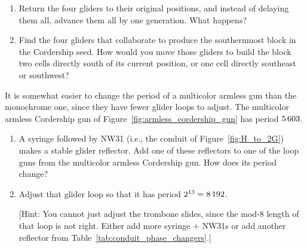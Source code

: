\begin{multicols}{2}
\begin{problem}
\begin{enumerate}[label=\bf\color{ocre}(\alph*)]
			\item {} Return the four gliders to their original positions, and instead of delaying them all, advance them all by one generation. What happens?
			
			\item {} Find the four gliders that collaborate to produce the southernmost block in the Cordership seed. How would you move those gliders to build the block two cells directly south of its current position, or one cell directly southeast or southwest?
		\end{enumerate}
	\end{problem}


	\mfilbreak
	
	
	\begin{problem}\label{exer:multicolor_armless}
		It is somewhat easier to change the period of a multicolor armless gun than the monochrome one, since they have fewer glider loops to adjust. The multicolor armless Cordership gun of Figure~\ref{fig:armless_cordership_gun} has period $5{\,}603$.\smallskip
		
		\begin{enumerate}[label=\bf\color{ocre}(\alph*)]
			\item {} A syringe followed by NW31 (i.e., the conduit of Figure~\ref{fig:H_to_2G}) makes a stable glider reflector. Add one of these reflectors to one of the loop guns from the multicolor armless Cordership gun. How does its period change?
			
			
			\item {} Adjust that glider loop so that it has period $2^{13} = 8{\,}192$.
			
			[Hint: You cannot just adjust the trombone slides, since the mod-$8$ length of that loop is not right. Either add more syringe $+$ NW31s or add another reflector from Table~\ref{tab:conduit_phase_changers}.]
			

\end{enumerate}
\end{problem}
\end{multicols}
